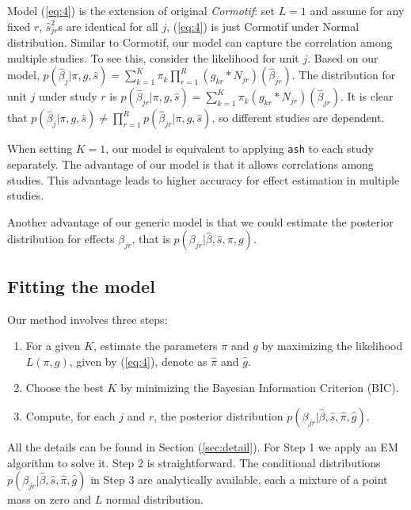 \documentclass[11pt]{article}
\begin{document}
Model (\ref{eq:4}) is the extension of original  \textit{Cormotif}: set $L=1$ and assume for any fixed $r$, $\hat s_{jr}^2$s are identical for all $j$, (\ref{eq:4}) is just Cormotif under Normal distribution. Similar to Cormotif, our model can capture the correlation among multiple studies. To see this, consider the likelihood for unit $j$. Based on our model, $p(\hat\beta_j|\pi,g,\hat s) = \sum_{k=1}^K\pi_k\prod_{r=1}^R(g_{kr}*N_{jr})(\hat\beta_{jr})$. The distribution for unit $j$ under study $r$ is $p(\hat\beta_{jr}|\pi,g,\hat s) = \sum_{k=1}^K\pi_k(g_{kr}*N_{jr})(\hat\beta_{jr})$. It is clear that $p(\hat\beta_j|\pi,g,\hat s) \neq \prod_{r=1}^Rp(\hat\beta_{jr}|\pi,g,\hat s)$, so different studies are dependent. 

When setting $K =1$, our model is equivalent to applying {\tt ash} \cite{ash} to each study separately. The advantage of our model is that it allows correlations among studies. This advantage leads to higher accuracy for effect estimation in multiple studies. 

Another advantage of our generic model is that we could estimate the posterior distribution for effects $\beta_{jr}$, that is $p(\beta_{jr}|\hat\beta,\hat s,\pi,g) $. 

\subsection{Fitting the model}

Our method involves three steps:
\begin{enumerate}
    \item For a given $K$, estimate the parameters $\pi$ and $g$ by maximizing the likelihood $L(\pi,g)$, given by (\ref{eq:4}), denote as $\hat\pi$ and $\hat g$.
    \item Choose the best $K$ by minimizing the Bayesian Information Criterion (BIC).
    \item Compute, for each $j$ and $r$, the posterior distribution $p(\beta_{jr}|\hat\beta,\hat s,\hat\pi,\hat g)$.
\end{enumerate}

All the details can be found in Section (\ref{sec:detail}). For Step 1 we apply an EM algorithm to solve it. Step 2 is straightforward. The conditional distributions $p(\beta_{jr}|\hat\beta,\hat s,\hat\pi,\hat g)$ in Step 3 are analytically available, each a mixture of a point mass on zero and $L$ normal distribution. 
\end{document}
